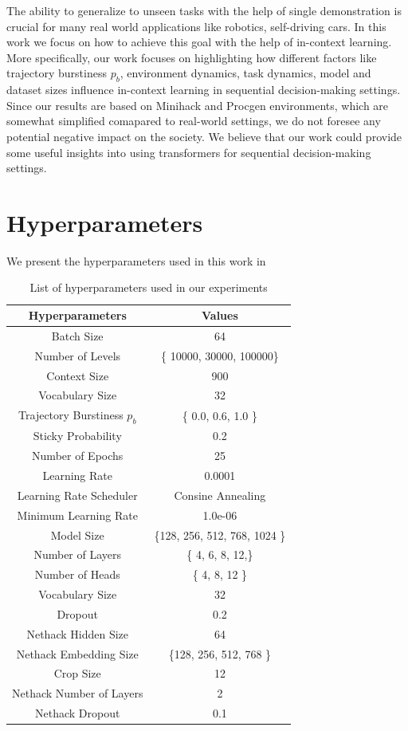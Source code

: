The ability to generalize to unseen tasks with the help of single demonstration is crucial for many real world applications like robotics, self-driving cars. In this work we focus on how to achieve this goal with the help of in-context learning. More specifically, our work focuses on highlighting how different factors like trajectory burstiness $p_b$, environment dynamics, task dynamics, model and dataset sizes influence in-context learning in sequential decision-making settings. Since our results are based on Minihack and Procgen environments, which are somewhat simplified comapared to real-world settings, we do not foresee any potential negative impact on the society. We believe that our work could provide some useful insights into using transformers for sequential decision-making settings. 

\section{Hyperparameters}
We present the hyperparameters used in this work in 
\begin{table}[h]
    \centering
    \begin{tabular}{c c}
        \hline
\textbf{Hyperparameters} & \textbf{Values} \\
\hline
Batch Size & 64 \\
Number of Levels & \{ 10000, 30000, 100000\} \\
Context Size & 900 \\
Vocabulary Size & 32 \\
Trajectory Burstiness $p_b$ & \{ 0.0, 0.6, 1.0 \} \\
Sticky Probability & 0.2 \\
Number of Epochs & 25 \\
Learning Rate & 0.0001 \\
Learning Rate Scheduler & Consine Annealing \\
Minimum Learning Rate & 1.0e-06 \\
Model Size & \{128, 256, 512, 768, 1024 \} \\
Number of Layers & \{ 4, 6, 8, 12,\} \\
Number of Heads & \{ 4, 8, 12 \} \\
Vocabulary Size & 32 \\
Dropout & 0.2 \\
Nethack Hidden Size & 64 \\
Nethack Embedding Size & \{128, 256, 512, 768 \} \\
Crop Size & 12 \\
Nethack Number of Layers & 2 \\
Nethack Dropout & 0.1 \\
\hline
    \end{tabular}
    \caption{List of hyperparameters used in our experiments}
    \label{tab:hps}
\end{table}
